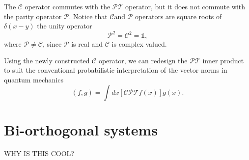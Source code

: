 \documentclass[12pt, a4paper]{report}
\newcommand\PT{\(\mathcal{PT}\)}
\newcommand\PP{\(\mathcal{P}\)}
\newcommand\CC{\(\mathcal{C}\)}
\begin{document}
The \CC\: operator commutes with the \PT\: operator, but it does not commute with the parity operator \PP. Notice that \CC\:and \PP\: operators are square roots of $\delta(x-y)$ the unity operator\cite{ComplexExtension}
\begin{equation}\label{eq:9}
\mathcal{P}^2 = \mathcal{C}^2 = \mathds{1}, 
\end{equation}
where $\mathcal{P} \neq \mathcal{C}$, since \PP\: is real and \CC\: is complex valued\cite{MustaHbeHermitian}\cite{Bender_2004}.

Using the newly constructed \CC\: operator, we can redesign the \PT\: inner product to suit the conventional probabilistic interpretation of the vector norms in quantum mechanics
\begin{equation}\label{eq:10}
\left( f, g \right ) = \int dx \left [ \mathcal{CPT} f(x) \right ] g(x).
\end{equation}
\section{Bi-orthogonal systems}\label{BiS}

WHY IS THIS COOL?\\
\end{document}
